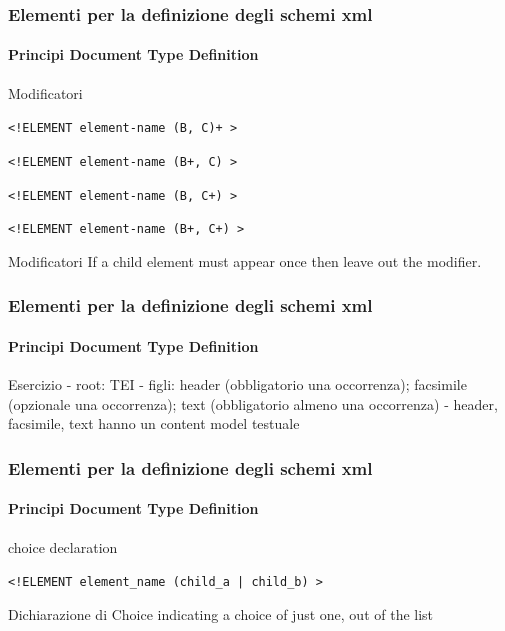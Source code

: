 \begin{frame}
    \frametitle{Elementi per la definizione degli schemi xml}
    \framesubtitle{Principi Document Type Definition}
    \addtocounter{nframe}{1}

    \begin{block}{Modificatori}
        \begin{center} \texttt{<!ELEMENT element-name (B, C)+ >} \end{center}
        \begin{center} \texttt{<!ELEMENT element-name (B+, C) >} \end{center}
        \begin{center} \texttt{<!ELEMENT element-name (B, C+) >} \end{center}
        \begin{center} \texttt{<!ELEMENT element-name (B+, C+) >} \end{center}
    \end{block}

    \begin{block}{Modificatori}
     If a child element must appear once then leave out the modifier.
    \end{block}
\end{frame}

\begin{frame}
    \frametitle{Elementi per la definizione degli schemi xml}
    \framesubtitle{Principi Document Type Definition}
    \addtocounter{nframe}{1}

    \begin{block}{Esercizio}
        - root: TEI
        - figli: header (obbligatorio una occorrenza); facsimile (opzionale una occorrenza); text (obbligatorio almeno una occorrenza)
        - header, facsimile, text hanno un content model testuale
    \end{block}

\end{frame}


\begin{frame}
    \frametitle{Elementi per la definizione degli schemi xml}
    \framesubtitle{Principi Document Type Definition}
    \addtocounter{nframe}{1}

    \begin{block}{choice declaration}
    \begin{center} \texttt{<!ELEMENT element_name (child_a | child_b) >} \end{center}
    \end{block}

    \begin{block}{Dichiarazione di Choice}
        indicating a choice of just one, out of the list
    \end{block}

\end{frame}

